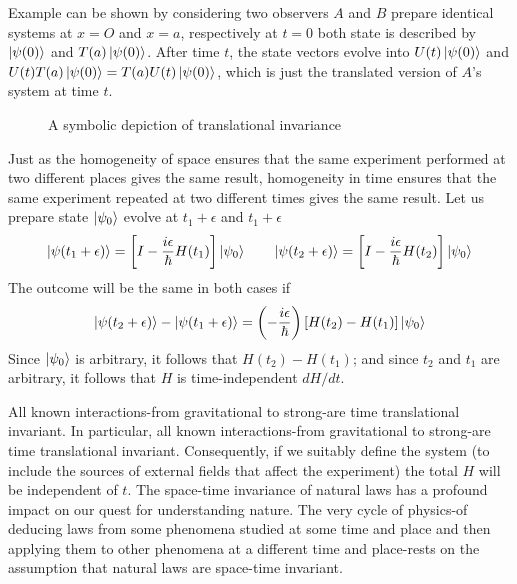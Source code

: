 \documentclass[../../../main.tex]{subfiles}
\begin{document}
Example can be shown by considering two observers $A$ and $B$ prepare identical systems at $x=O$ and $x=a$, respectively at $t=0$ both state is described by $\ket{\psi(0)}$ and $T(a)\ket{\psi(0)}$.
After time $t$, the state vectors evolve into $U(t) \ket{\psi(0)}$ and $U(t)T(a)\ket{\psi(0)} = T(a)U(t)\ket{\psi(0)}$, which is just the translated version of $A$'s system at time $t$.

\begin{figure}
    \centering
    \caption*{A symbolic depiction of translational invariance}
\end{figure}

Just as the homogeneity of space ensures that the same experiment performed at two different places gives the same result, homogeneity in time ensures that the same experiment repeated at two different times gives the same result.
Let us prepare state $\ket{\psi_0}$ evolve at $t_1+\epsilon$ and $t_1+\epsilon$
\begin{equation*}
    \ket{\psi(t_1+\epsilon)} = \left[I-\frac{i\epsilon}{\hbar}H(t_1)\right]\ket{\psi_0}\qquad
\ket{\psi(t_2+\epsilon)} = \left[I-\frac{i\epsilon}{\hbar}H(t_2)\right]\ket{\psi_0}
\end{equation*}
The outcome will be the same in both cases if
\begin{equation*}
    \ket{\psi(t_2+\epsilon)} - \ket{\psi(t_1+\epsilon)} =\left( -\frac{i \epsilon }{\hbar } \right)  \left[H(t_2) - H(t_1)\right]\ket{\psi_0}    
\end{equation*}
Since $\ket{\psi_0}$ is arbitrary, it follows that $H(t_2) - H(t_1)$; and since $t_2$ and $t_1$ are arbitrary, it follows that $H$ is time-independent $dH/dt$.

All known interactions-from gravitational to strong-are time translational invariant. 
In particular, all known interactions-from gravitational to strong-are time translational invariant. 
Consequently, if we suitably define the system (to include the sources of external fields that affect the experiment) the total $H$ will be independent of $t$. 
The space-time invariance of natural laws has a profound impact on our quest for understanding nature. 
The very cycle of physics-of deducing laws from some phenomena studied at some time and place and then applying them to other phenomena at a different time and place-rests on the assumption that natural laws are space-time invariant.
\end{document}
